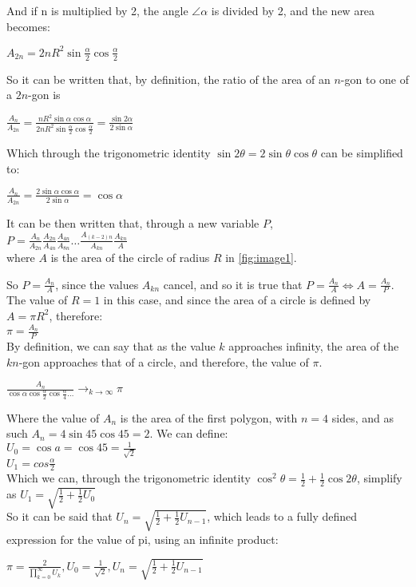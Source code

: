 And if n is multiplied by 2, the angle $\angle \alpha$ is divided by 2,
and the new area becomes:

$A_{2n} = 2n R^2 \sin{\frac{\alpha}{2}} \cos{\frac{\alpha}{2}}$

So it can be written that, by definition, the ratio of
the area of an $n$-gon to one of a $2n$-gon is

$\frac{A_{n}}{A_{2n}} = \frac{n R^2 \sin{\alpha} \cos{\alpha}}{2 n R^2 \sin{\frac{\alpha}{2}} \cos{\frac{\alpha}{2}}} = \frac{\sin{2 \alpha}}{2 \sin{\alpha}}$

Which through the trigonometric identity $\sin{2 \theta} = 2\sin{\theta} \cos{\theta}$ can
be simplified to:

$\frac{A_{n}}{A_{2n}} = \frac{2\sin{\alpha} \cos{\alpha} }{2\sin{\alpha}}  = \cos{\alpha}$

It can be then written that, through a new variable $P$, \\
$P = \frac{A_{n}}{A_{2n}} \frac{A_{2n}}{A_{4n}} \frac{A_{4n}}{A_{8n}} \dots \frac{A_{(k-2)n}}{A_{kn}} \frac{A_{kn}}{A}$ \\
where $A$ is the area of the circle of radius $R$
in \ref{fig:image1}.

So $P = \frac{A_{n}}{A}$, since the values $A_{kn}$ cancel, and
so it is true that $P = \frac{A_{n}}{A} \Leftrightarrow A = \frac{A_{n}}{P}$. The
value of $R = 1$ in this case, and since the area of a circle is defined
by $A = \pi R^2$, therefore: \\
$\pi = \frac{A_{n}}{P}$ \\
By definition, we can say that as the value $k$ approaches infinity, the area of the $kn$-gon
approaches that of a circle, and therefore, the value of $\pi$.

$\frac{A_{n}}{\cos{\alpha} \cos{\frac{\alpha}{2}} \cos{\frac{\alpha}{4}} \dots}
  \to_{k \to \infty} \pi$

Where the value of $A_{n}$ is the area of the first polygon, with $n=4$ sides, and as such
$A_{n} = 4 \sin{45} \cos{45} = 2$. We can define: \\
$U_{0} = \cos{a} = \cos{45} = \frac{1}{\sqrt{2}}$ \\
$U_{1} = cos{\frac{\alpha}{2}}$ \\
Which we can, through the trigonometric identity
$\cos^2{\theta} = \frac{1}{2} + \frac{1}{2} \cos{2\theta}$, simplify as
$U_{1} = \sqrt{\frac{1}{2} + \frac{1}{2} U_{0}}$ \\
So it can be said that $U_{n} = \sqrt{\frac{1}{2} + \frac{1}{2} U_{n - 1}}$, which leads to
a fully defined expression for the value of pi, using an infinite product:

$\pi = \frac{2}{\prod\limits_{k=0}^\infty U_{k}}, U_{0} = \frac{1}{\sqrt{2}}, U_{n} = \sqrt{\frac{1}{2} + \frac{1}{2} U_{n - 1}}$ \footnotemark



